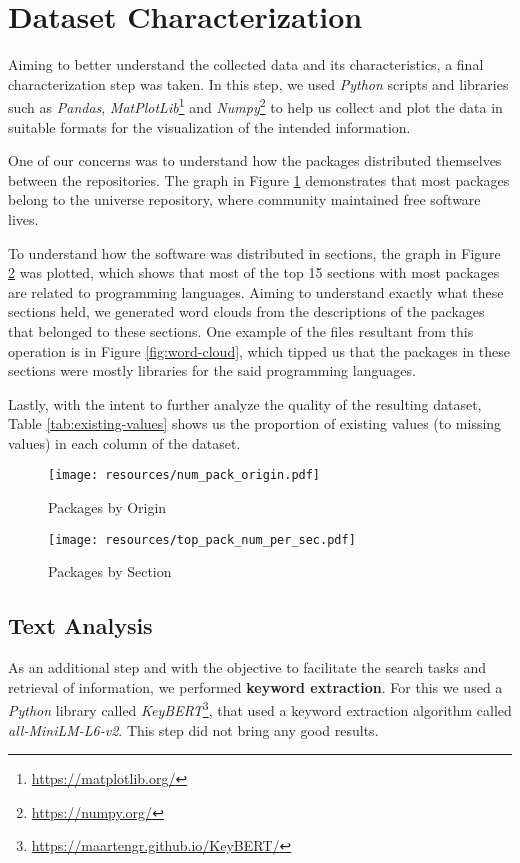\section{Dataset Characterization}
\label{sec:Characterization}


Aiming to better understand the collected data and its characteristics, a final characterization step was taken. In this step, we used \emph{Python} scripts and libraries such as \emph{Pandas}, \emph{MatPlotLib}\footnote{\url{https://matplotlib.org/}} and \emph{Numpy}\footnote{\url{https://numpy.org/}} to help us collect and plot the data in suitable formats for the visualization of the intended information. 

One of our concerns was to understand how the packages distributed themselves between the repositories. The graph in Figure \ref{fig:package-origins} demonstrates that most packages belong to the universe repository, where community maintained free software lives.

To understand how the software was distributed in sections, the graph in Figure \ref{fig:package-sections} was plotted, which shows that most of the top 15 sections with most packages are related to programming languages. Aiming to understand exactly what these sections held, we generated word clouds from the descriptions of the packages that belonged to these sections. One example of the files resultant from this operation is in Figure \ref{fig:word-cloud}, which tipped us that the packages in these sections were mostly libraries for the said programming languages. 

Lastly, with the intent to further analyze the quality of the resulting dataset, Table \ref{tab:existing-values} shows us the proportion of existing values (to missing values) in each column of the dataset.




\begin{figure}[]
    \centering
    \texttt{[image: resources/num\_pack\_origin.pdf]}
    \caption{Packages by Origin}
    \label{fig:package-origins}
\end{figure}

\begin{figure}[]
    \centering
    \texttt{[image: resources/top\_pack\_num\_per\_sec.pdf]}
    \caption{Packages by Section}
    \label{fig:package-sections}
\end{figure}


\subsection{Text Analysis}
As an additional step and with the objective to facilitate the search tasks and retrieval of information,  we performed \textbf{keyword extraction}. For this we used a \emph{Python} library called \emph{KeyBERT}\footnote{\url{https://maartengr.github.io/KeyBERT/}}, that used a keyword extraction algorithm called \emph{all-MiniLM-L6-v2}. This step did not bring any good results.